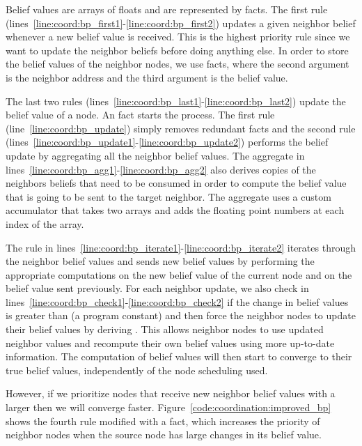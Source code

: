 \clearpage

Belief values are arrays of floats and are represented by  facts.
The first rule (lines~\ref{line:coord:bp_first1}-\ref{line:coord:bp_first2})
updates a given neighbor belief whenever a new belief value is received. This is
the highest priority rule since we want to update the neighbor beliefs before
doing anything else. In order to store the belief values of the neighbor nodes,
we use  facts, where the second argument is the neighbor
address and the third argument is the belief value.

The last two rules (lines~\ref{line:coord:bp_last1}-\ref{line:coord:bp_last2})
update the belief value of a node. An  fact starts the process.
The first rule (line~\ref{line:coord:bp_update}) simply removes redundant
 facts and the second rule
(lines~\ref{line:coord:bp_update1}-\ref{line:coord:bp_update2}) performs the
belief update by aggregating all the neighbor belief values. The aggregate in
lines~\ref{line:coord:bp_agg1}-\ref{line:coord:bp_agg2} also derives copies of
the neighbors beliefs that need to be consumed in order to compute the belief
value that is going to be sent to the target neighbor. The aggregate uses a
custom accumulator that takes two arrays and adds the floating point numbers at
each index of the array.

The rule in lines~\ref{line:coord:bp_iterate1}-\ref{line:coord:bp_iterate2}
iterates through the neighbor belief values and sends new belief values by
performing the appropriate computations on the new belief value of the current
node and on the belief value sent previously. For each neighbor update, we also
check in lines~\ref{line:coord:bp_check1}-\ref{line:coord:bp_check2} if the
change in belief values is greater than  (a program constant) and
then force the neighbor nodes to update their belief values by deriving
. This allows neighbor nodes to use updated neighbor values and
recompute their own belief values using more up-to-date information. The
computation of belief values will then start to converge to their true belief
values, independently of the node scheduling used.

However, if we prioritize nodes that receive new neighbor belief values with a
larger  then we will converge faster.
Figure~\ref{code:coordination:improved_bp} shows the fourth rule modified with a
 fact, which increases the priority of neighbor nodes when
the source node has large changes in its belief value.

